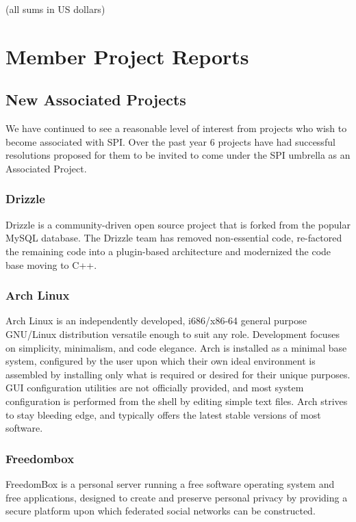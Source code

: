 \documentclass[letterpaper]{report}
\begin{document}
(all sums in US dollars)


\chapter{Member Project Reports}

\section{New Associated Projects}

We have continued to see a reasonable level of interest from projects who wish
to become associated with SPI. Over the past year 6 projects have had
successful resolutions proposed for them to be invited to come under the SPI
umbrella as an Associated Project.


\subsection{Drizzle}

Drizzle is a community-driven open source project that is forked from the
popular MySQL database. The Drizzle team has removed non-essential code,
re-factored the remaining code into a plugin-based architecture and modernized
the code base moving to C++.


\subsection{Arch Linux}

Arch Linux is an independently developed, i686/x86-64 general purpose GNU/Linux
distribution versatile enough to suit any role. Development focuses on
simplicity, minimalism, and code elegance. Arch is installed as a minimal base
system, configured by the user upon which their own ideal environment is
assembled by installing only what is required or desired for their unique
purposes. GUI configuration utilities are not officially provided, and most
system configuration is performed from the shell by editing simple text files.
Arch strives to stay bleeding edge, and typically offers the latest stable
versions of most software.


\subsection{Freedombox}

FreedomBox is a personal server running a free software operating system and
free applications, designed to create and preserve personal privacy by
providing a secure platform upon which federated social networks can be
constructed.
\end{document}
